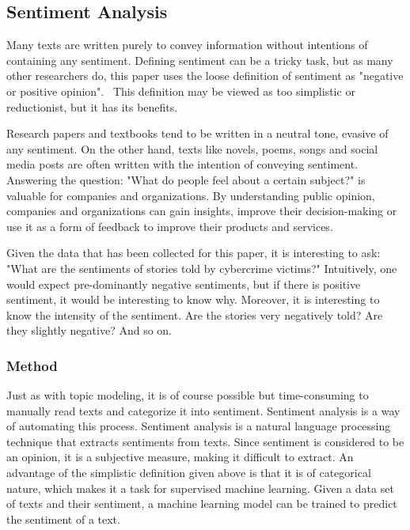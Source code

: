 \subsection{Sentiment Analysis}

Many texts are written purely to convey information without intentions of containing any sentiment. Defining sentiment can be a tricky task, but as many other researchers do, this paper uses the loose definition of sentiment as "negative or positive opinion".~\cite{mejova2009sentiment} This definition may be viewed as too simplistic or reductionist, but it has its benefits.

Research papers and textbooks tend to be written in a neutral tone, evasive of any sentiment. On the other hand, texts like novels, poems, songs and social media posts are often written with the intention of conveying sentiment. Answering the question: "What do people feel about a certain subject?" is valuable for companies and organizations. By understanding public opinion, companies and organizations can gain insights, improve their decision-making or use it as a form of feedback to improve their products and services.~\cite{mejova2009sentiment}

Given the data that has been collected for this paper, it is interesting to ask: "What are the sentiments of stories told by cybercrime victims?" Intuitively, one would expect pre-dominantly negative sentiments, but if there is positive sentiment, it would be interesting to know why. Moreover, it is interesting to know the intensity of the sentiment. Are the stories very negatively told? Are they slightly negative? And so on.

\subsubsection*{Method}

Just as with topic modeling, it is of course possible but time-consuming to manually read texts and categorize it into sentiment. Sentiment analysis is a way of automating this process. Sentiment analysis is a natural language processing technique that extracts sentiments from texts. Since sentiment is considered to be an opinion, it is a subjective measure, making it difficult to extract. An advantage of the simplistic definition given above is that it is of categorical nature, which makes it a task for supervised machine learning. Given a data set of texts and their sentiment, a machine learning model can be trained to predict the sentiment of a text.

